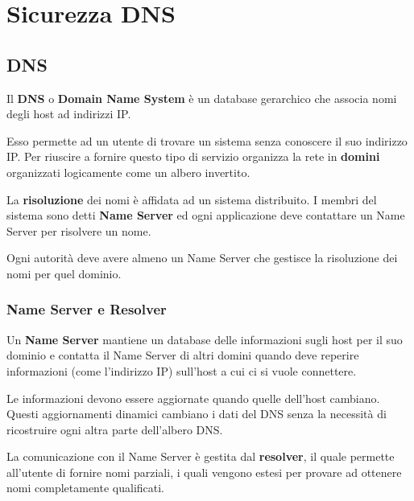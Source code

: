 \chapter{Sicurezza DNS}
\section{DNS}
Il \textbf{DNS} o \textbf{Domain Name System} è un database gerarchico che associa nomi degli host ad indirizzi IP.

Esso permette ad un utente di trovare un sistema senza conoscere il suo indirizzo IP. Per riuscire a fornire questo
tipo di servizio organizza la rete in \textbf{domini} organizzati logicamente come un albero invertito.

La \textbf{risoluzione} dei nomi è affidata ad un sistema distribuito. I membri del sistema sono detti
\textbf{Name Server} ed ogni applicazione deve contattare un Name Server per risolvere un nome.

Ogni autorità deve avere almeno un Name Server che gestisce la risoluzione dei nomi per quel dominio.

\subsection{Name Server e Resolver}
Un \textbf{Name Server} mantiene un database delle informazioni sugli host per il suo dominio e contatta il Name
Server di altri domini quando deve reperire informazioni (come l'indirizzo IP) sull'host a cui ci si vuole connettere.

Le informazioni devono essere aggiornate quando quelle dell'host cambiano. Questi aggiornamenti dinamici cambiano i
dati del DNS senza la necessità di ricostruire ogni altra parte dell'albero DNS.

La comunicazione con il Name Server è gestita dal \textbf{resolver}, il quale permette all'utente di fornire nomi
parziali, i quali vengono estesi per provare ad ottenere nomi completamente qualificati.
